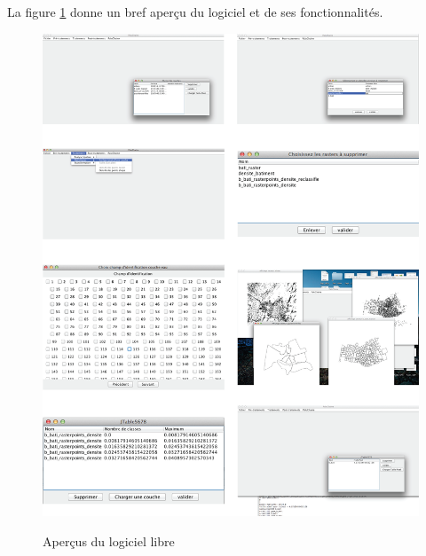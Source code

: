 La figure \ref{aperculogiciel} donne un bref aperçu du logiciel et de ses fonctionnalités. 
 
\newpage



\begin{figure}[H]
\begin{center}
\includegraphics[width=17cm]{Logiciel}\\
\caption{\label{aperculogiciel}Aperçus du logiciel libre}
\end{center}
\end{figure}






